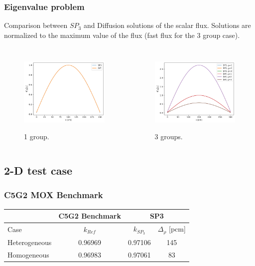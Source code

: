 \begin{frame}
\frametitle{Eigenvalue problem}

Comparison between $SP_3$ and Diffusion solutions of the scalar flux.
Solutions are normalized to the maximum value of the flux (fast flux for the 3 group case).

\begin{columns}
    \column[t]{5cm}
	\begin{figure}[htbp!]
		\begin{center}
			\includegraphics[height=4cm]{../sp3-diffusion/output-1g-crit}
		\end{center}
		\caption{1 group.}
	\end{figure}

	\column[t]{5cm}
	\begin{figure}[htbp!]
		\begin{center}
			\includegraphics[height=4cm]{../sp3-diffusion/output-3g-crit}
		\end{center}
		\caption{3 groups.}
	\end{figure}
\end{columns}
\end{frame}


\subsection{2-D test case}
\begin{frame}
\frametitle{C5G2 MOX Benchmark}
	\begin{table}[htbp!]
	\centering
	\begin{tabular}{lccc}
	\toprule
	 & C5G2 Benchmark      & \multicolumn{2}{c}{SP3}          \\
	\midrule
	Case & $k_{Ref}$       & $k_{SP_3}$ & $\Delta_\rho$ [pcm] \\
	\midrule
	Heterogeneous & 0.96969  & 0.97106  & 145  \\
	Homogeneous   & 0.96983  & 0.97061  &  83  \\
	\bottomrule
	\end{tabular}
	\label{tab:2d-keff}
	\end{table}
\end{frame}

